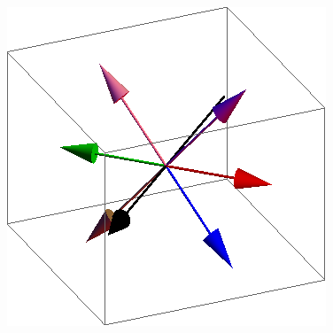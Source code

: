 \documentclass{article}
\begin{document}
\begin{figure}[ht]
\includegraphics[scale=0.23]{110/501S005to000R.png}
\caption{}
\end{figure}
\clearpage
\end{document}
